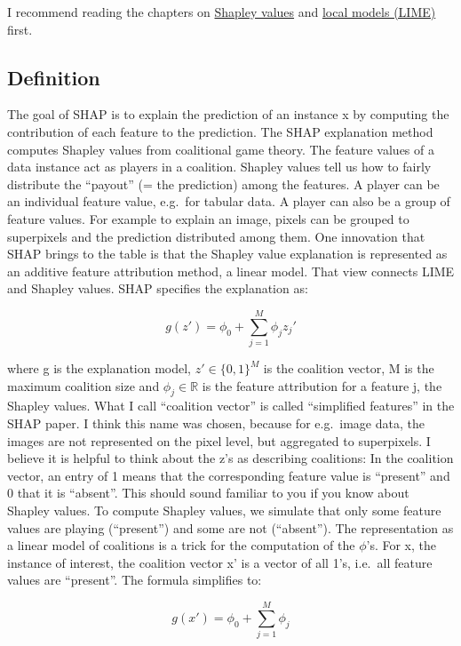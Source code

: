 \documentclass[
  11pt,
]{scrbook}
\begin{document}
I recommend reading the chapters on \protect\hyperlink{shapley}{Shapley values} and \protect\hyperlink{lime}{local models (LIME)} first.

\hypertarget{definition}{%
\subsection{Definition}\label{definition}}

The goal of SHAP is to explain the prediction of an instance x by computing the contribution of each feature to the prediction.
The SHAP explanation method computes Shapley values from coalitional game theory.
The feature values of a data instance act as players in a coalition.
Shapley values tell us how to fairly distribute the ``payout'' (= the prediction) among the features.
A player can be an individual feature value, e.g.~for tabular data.
A player can also be a group of feature values.
For example to explain an image, pixels can be grouped to superpixels and the prediction distributed among them.
One innovation that SHAP brings to the table is that the Shapley value explanation is represented as an additive feature attribution method, a linear model.
That view connects LIME and Shapley values.
SHAP specifies the explanation as:

\[g(z')=\phi_0+\sum_{j=1}^M\phi_jz_j'\]

where g is the explanation model, \(z'\in\{0,1\}^M\) is the coalition vector, M is the maximum coalition size and \(\phi_j\in\mathbb{R}\) is the feature attribution for a feature j, the Shapley values.
What I call ``coalition vector'' is called ``simplified features'' in the SHAP paper.
I think this name was chosen, because for e.g.~image data, the images are not represented on the pixel level, but aggregated to superpixels.
I believe it is helpful to think about the z's as describing coalitions:
In the coalition vector, an entry of 1 means that the corresponding feature value is ``present'' and 0 that it is ``absent''.
This should sound familiar to you if you know about Shapley values.
To compute Shapley values, we simulate that only some feature values are playing (``present'') and some are not (``absent'').
The representation as a linear model of coalitions is a trick for the computation of the \(\phi\)'s.
For x, the instance of interest, the coalition vector x' is a vector of all 1's, i.e.~all feature values are ``present''.
The formula simplifies to:

\[g(x')=\phi_0+\sum_{j=1}^M\phi_j\]
\end{document}
